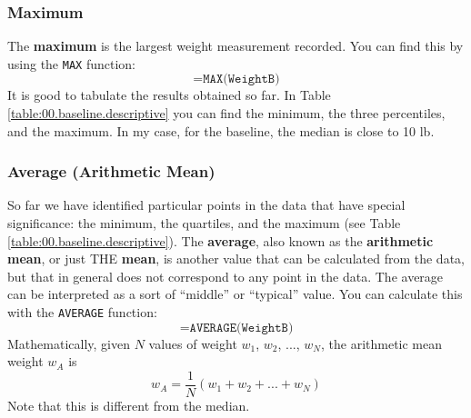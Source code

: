 \subsubsection{Maximum}
%
The \textbf{maximum} is the largest weight measurement recorded. You can find this by using the \texttt{MAX} function:
\begin{equation}
    \texttt{=MAX(WeightB)}
    \label{eq:00.max}
\end{equation}
It is good to tabulate the results obtained so far. In Table \ref{table:00.baseline.descriptive} you can find the minimum, the three percentiles, and the maximum. In my case, for the baseline, the median is close to 10 lb.
%
\begin{center}
\end{center}
%
\subsubsection{Average (Arithmetic Mean)}
%
So far we have identified particular points in the data that have special significance: the minimum, the quartiles, and the maximum (see Table \ref{table:00.baseline.descriptive}). The \textbf{average}, also known as the \textbf{arithmetic mean}, or just THE \textbf{mean}, is another value that can be calculated from the data, but that in general does not correspond to any point in the data. The average can be interpreted as a sort of ``middle'' or ``typical'' value. You can calculate this with the \texttt{AVERAGE} function:
\begin{equation}
    \texttt{=AVERAGE(WeightB)}
    \label{eq:00.average}
\end{equation}
Mathematically, given $N$ values of weight $w_{1}$, $w_{2}$, ..., $w_{N}$, the arithmetic mean weight $w_{A}$ is
\begin{equation}
    w_{A} = \frac{1}{N} \left( w_{1} + w_{2} + ... + w_{N} \right)
\end{equation}
Note that this is different from the median.
%
\begin{center}
\end{center}
%
